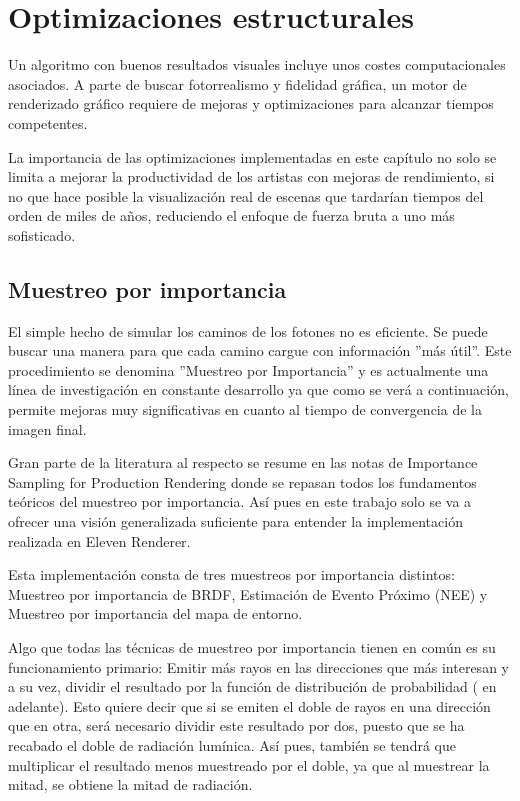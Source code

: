 ﻿\chapter{Optimizaciones estructurales}
	
Un algoritmo con buenos resultados visuales incluye unos costes computacionales asociados. A parte de buscar fotorrealismo y fidelidad gráfica, un motor de renderizado gráfico requiere de mejoras y optimizaciones para alcanzar tiempos competentes.

La importancia de las optimizaciones implementadas en este capítulo no solo se limita a mejorar la productividad de los artistas con mejoras de rendimiento, si no que hace posible la visualización real de escenas que tardarían tiempos del orden de miles de años, reduciendo el enfoque de fuerza bruta a uno más sofisticado.
	
\section{Muestreo por importancia}
\label{sec:mi}

El simple hecho de simular los caminos de los fotones no es eficiente. Se puede buscar una manera para que cada camino cargue con información ''más útil''. Este procedimiento se denomina ''Muestreo por Importancia'' y es actualmente una línea de investigación en constante desarrollo ya que como se verá a continuación, permite mejoras muy significativas en cuanto al tiempo de convergencia de la imagen final.

Gran parte de la literatura al respecto se resume en las notas de Importance Sampling for Production Rendering\cite{colbert2010importance} donde se repasan todos los fundamentos teóricos del muestreo por importancia. Así pues en este trabajo solo se va a ofrecer una visión generalizada suficiente para entender la implementación realizada en Eleven Renderer.

Esta implementación consta de tres muestreos por importancia distintos: Muestreo por importancia de BRDF, Estimación de Evento Próximo (NEE) y Muestreo por importancia del mapa de entorno.

Algo que todas las técnicas de  muestreo por importancia tienen en común es su funcionamiento primario: Emitir más rayos en las direcciones que más interesan y a su vez, dividir el resultado por la función de distribución de probabilidad ( en adelante). Esto quiere decir que si se emiten el doble de rayos en una dirección que en otra, será necesario dividir este resultado por dos, puesto que se ha recabado el doble de radiación lumínica. Así pues, también se tendrá que multiplicar el resultado menos muestreado por el doble, ya que al muestrear la mitad, se obtiene la mitad de radiación.

